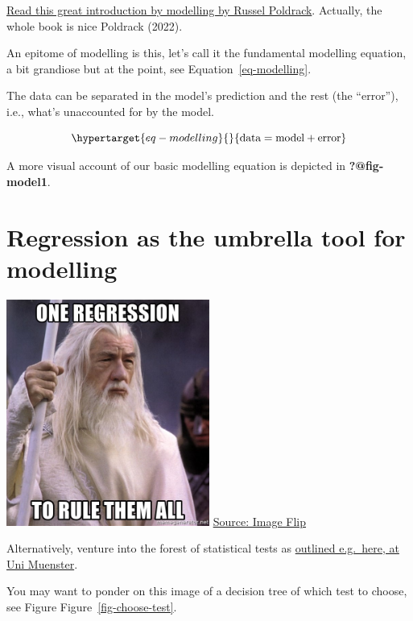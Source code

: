 \documentclass[
  letterpaper,
  DIV=11,
  numbers=noendperiod]{scrreprt}
\theoremstyle{definition}
\theoremstyle{definition}
\theoremstyle{remark}
\begin{document}
\href{https://statsthinking21.github.io/statsthinking21-core-site/fitting-models.html\#what-is-a-model}{Read
this great introduction by modelling by Russel Poldrack}. Actually, the
whole book is nice Poldrack (2022).

An epitome of modelling is this, let's call it the fundamental modelling
equation, a bit grandiose but at the point, see
Equation~\ref{eq-modelling}.

The data can be separated in the model's prediction and the rest (the
``error''), i.e., what's unaccounted for by the model.

\begin{equation}\protect\hypertarget{eq-modelling}{}{
\text{data} = \text{model} + \text{error}
}\label{eq-modelling}\end{equation}

A more visual account of our basic modelling equation is depicted in
\textbf{?@fig-model1}.

\hypertarget{regression-as-the-umbrella-tool-for-modelling}{%
\section{Regression as the umbrella tool for
modelling}\label{regression-as-the-umbrella-tool-for-modelling}}

\includegraphics[width=0.5\textwidth,height=\textheight]{./img/one-regression-to-rule-them-all.jpeg}
\href{www.imgflip.com}{Source: Image Flip}

Alternatively, venture into the forest of statistical tests as
\href{https://web.archive.org/web/20091029162244/http://www.wiwi.uni-muenster.de/ioeb/en/organisation/pfaff/stat_overview_table.html}{outlined
e.g.~here, at Uni Muenster}.

You may want to ponder on this image of a decision tree of which test to
choose, see Figure Figure~\ref{fig-choose-test}.
\end{document}
